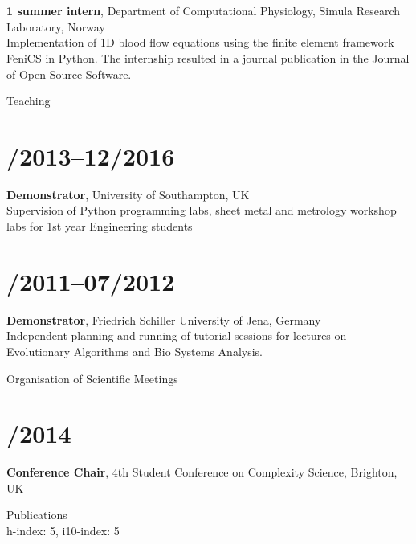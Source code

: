 \documentclass[margin,line,10pt]{res}
\begin{document}
\begin{resume}
\section{}{\bf 1 summer intern}, Department of Computational Physiology, Simula Research Laboratory, Norway\\
Implementation of 1D blood flow equations using the finite element framework FeniCS in Python. The internship resulted in a journal publication in the Journal of Open Source Software.\\

\vspace*{-.2in}

{\sc Teaching}\\
\vspace*{-.35in}
\section{/2013--12/2016}{\bf Demonstrator}, University of Southampton, UK\\
Supervision of Python programming labs, sheet metal and metrology workshop labs for 1st year Engineering students\\
\vspace*{-.35in}
\section{/2011--07/2012}{\bf Demonstrator}, Friedrich Schiller University of Jena, Germany\\
Independent planning and running of tutorial sessions for lectures on Evolutionary Algorithms and Bio Systems Analysis.\\

\vspace*{-.2in}

{\sc Organisation of Scientific Meetings}\\
\vspace*{-.35in}
\section{/2014}{\bf Conference Chair}, 4th Student Conference on Complexity Science, Brighton, UK\\

\vspace*{-.2in}

{\sc Publications}\\
h-index: 5, i10-index: 5\\
\vspace*{-.35in}

\end{resume}
\end{document}
